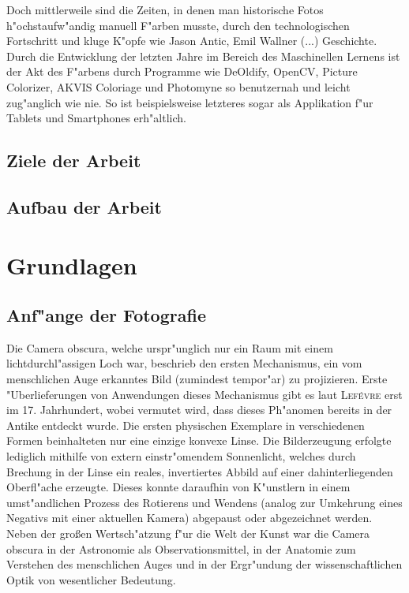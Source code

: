 \documentclass[12pt,titlepage]{article}
\begin{document}
Doch mittlerweile sind die Zeiten, in denen man historische Fotos h"ochstaufw"andig manuell F"arben
musste, durch den technologischen Fortschritt und kluge K"opfe wie Jason Antic, Emil Wallner (...)
Geschichte.
Durch die Entwicklung der letzten Jahre im Bereich des Maschinellen Lernens ist der Akt des
F"arbens durch Programme wie DeOldify, OpenCV, Picture Colorizer, AKVIS Coloriage und
Photomyne so benutzernah und leicht zug"anglich wie nie. So ist beispielsweise letzteres sogar als
Applikation f"ur Tablets und Smartphones erh"altlich.

    \pagebreak
\subsection{Ziele der Arbeit}

\subsection{Aufbau der Arbeit}

    \pagebreak
    
\section{Grundlagen}

\subsection{Anf"ange der Fotografie}
Die Camera obscura, welche urspr"unglich nur ein Raum mit einem lichtdurchl"assigen Loch war, beschrieb den ersten Mechanismus, ein vom menschlichen Auge erkanntes Bild (zumindest tempor"ar) zu projizieren. Erste "Uberlieferungen von Anwendungen dieses Mechanismus gibt es laut \textsc{Lef\'evre \cite{lefevre2007inside}} erst im 17. Jahrhundert, wobei vermutet wird, dass dieses Ph"anomen bereits in der Antike entdeckt wurde. Die ersten physischen Exemplare in verschiedenen Formen beinhalteten nur eine einzige konvexe Linse. Die Bilderzeugung erfolgte lediglich mithilfe von extern einstr"omendem Sonnenlicht, welches durch Brechung in der Linse ein reales, invertiertes Abbild auf einer dahinterliegenden Oberfl"ache erzeugte. Dieses konnte daraufhin von K"unstlern in einem umst"andlichen Prozess des Rotierens und Wendens (analog zur Umkehrung eines Negativs mit einer aktuellen Kamera) abgepaust oder abgezeichnet werden.
Neben der gro\ss en Wertsch"atzung f"ur die Welt der Kunst war die Camera obscura in der Astronomie als Observationsmittel, in der Anatomie zum Verstehen des menschlichen Auges und in der Ergr"undung der wissenschaftlichen Optik von wesentlicher Bedeutung. \textsc{\cite{lefevre2007inside, mills1998vermeer}}
\end{document}
